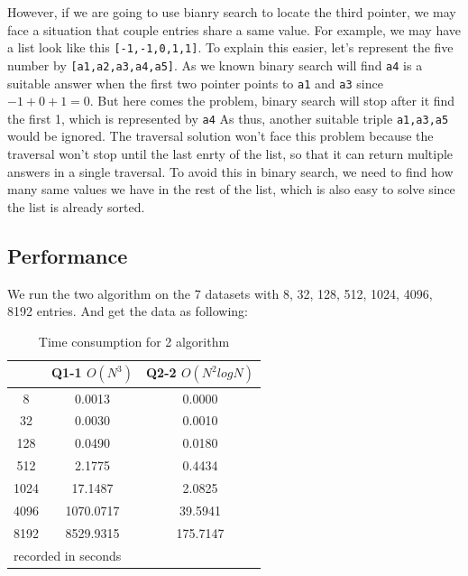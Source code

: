 \documentclass[conference]{IEEEtran}
\begin{document}
However, if we are going to use bianry search to locate the third pointer, we may face a 
situation that couple entries share a same value. For example, we may have a list look 
like this \verb|[-1,-1,0,1,1]|. To explain this easier, let's represent the five number by 
\verb|[a1,a2,a3,a4,a5]|. As we known binary search will find \verb|a4| is a suitable answer
when the first two pointer points to \verb|a1| and \verb|a3| since $-1+0+1=0$. But here comes
the problem, binary search will stop after it find the first 1, which is represented by \verb|a4|
As thus, another suitable triple \verb|a1,a3,a5| would be ignored. The traversal solution won't
face this problem because the traversal won't stop until the last enrty of the list, so that 
it can return multiple answers in a single traversal. To avoid this in binary search, we need
to find how many same values we have in the rest of the list, which is also easy to solve since
the list is already sorted.

\subsection*{Performance}
We run the two algorithm on the 7 datasets with 8, 32, 128, 512, 1024, 4096, 8192 entries. 
And get the data as following:

\begin{table}[H]
    \caption{Time consumption for 2 algorithm}
    \begin{center}
        \begin{tabular}{|c|c|c|}
            \hline
             & Q1-1 $O(N^3)$ & Q2-2 $O(N^2logN)$\\
            \hline
            8&	0.0013&	0.0000 \\
            \hline
            32&	0.0030&	0.0010 \\
            \hline
            128&	0.0490&	0.0180 \\
            \hline
            512	&2.1775&	0.4434 \\
            \hline
            1024&	17.1487&	2.0825 \\
            \hline
            4096&	1070.0717&	39.5941 \\
            \hline
            8192&	8529.9315&	175.7147 \\       
            \hline
            \multicolumn{3}{l}{recorded in seconds}\\
        \end{tabular}
    \end{center}
\end{table}
\end{document}
